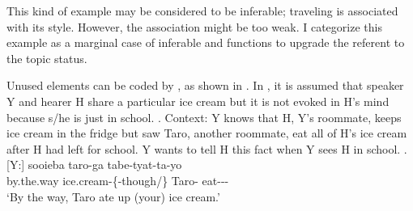 This kind of example may be considered to be inferable;
traveling is associated with its style.
However, the association might be too weak.
I categorize this example as a marginal case of inferable
and  functions to upgrade the referent to the topic status.

Unused elements can be coded by ,
as shown in \Next.
In \Next,
it is assumed that speaker Y and hearer H share a particular ice cream
but it is not evoked in H's mind
because s/he is just in school.
%
\ex. \label{aisuT}Context: Y knows that H, Y's roommate, keeps ice cream in the fridge
	but saw Taro, another roommate, eat all of H's ice cream after H had left for school.
	Y wants to tell H this fact when Y sees H in school.
	\ag.[Y:] sooieba  taro-ga tabe-tyat-ta-yo \\
		by.the.way ice.cream-\{-though/\} Taro- eat--- \\
		`By the way, Taro ate up (your) ice cream.'


%		


